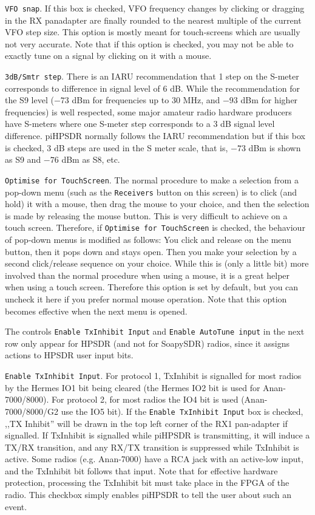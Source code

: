 \documentclass[12pt]{book}
\def\rett#1{\texttt{\color{red}#1}}
\def\pH{pi\-HPSDR\xspace}
\begin{document}
\rett{VFO snap}. If this box is checked, VFO frequency changes by clicking or dragging in the
RX panadapter are finally rounded to the nearest multiple of the current VFO step size. This
option is mostly meant for touch-screens which are usually not very accurate. Note that if
this option is checked, you may not be able to exactly tune on a signal by clicking on
it with a mouse.

\rett{3dB/Smtr step}. There is an IARU recommendation that 1 step on the S-meter
corresponds to difference in signal level of 6 dB. While the recommendation for the
S9 level ($-73$ dBm for frequencies up to 30 MHz, and $-93$ dBm for higher frequencies)
is well respected, some major amateur radio hardware producers have S-meters where
one S-meter step corresponds to a 3 dB signal level difference. \pH normally follows
the IARU recommendation but if this box is checked, 3 dB steps are used in the S meter
scale, that is, $-73$ dBm is shown as S9 and $-76$ dBm as S8, etc.

\rett{Optimise for TouchScreen}. The normal procedure to make a selection from a
pop-down menu (such as the \rett{Receivers} button on this screen) is to click
(and hold) it with a mouse, then drag the mouse to your choice, and then the selection
is made by releasing the mouse button. This is very difficult to achieve on a touch
screen. Therefore, if \rett{Optimise for TouchScreen} is checked, the behaviour of pop-down
menus is modified as follows: You click and release on the menu button, then it pops
down and stays open. Then you make your selection by a second click/release sequence
on your choice. While this is (only a little bit) more involved than the normal procedure
when using a mouse, it is a great helper when using a touch screen. Therefore this
option is set by default, but you can uncheck it here if you prefer normal
mouse operation. Note that this option becomes effective when the next menu is opened.


The controls \rett{Enable TxInhibit Input} and \rett{Enable AutoTune  input}
in the next row only appear for HPSDR (and not for SoapySDR) radios, since it assigns actions to
HPSDR user input bits.

\rett{Enable TxInhibit Input}. For  protocol 1, TxInhibit is signalled for most radios by the Hermes IO1 bit being
cleared (the Hermes IO2 bit is used for Anan-7000/8000). For protocol 2, for most
radios the IO4 bit is used (Anan-7000/8000/G2 use the IO5 bit).
If the \rett{Enable TxInhibit Input} box is checked, ,,TX Inhibit'' will be drawn
in the top left corner of the RX1 pan-adapter if signalled. If TxInhibit is signalled
while \pH is transmitting, it will induce a TX/RX transition, and any RX/TX
transition is suppressed while TxInhibit is active. Some radios (e.g. Anan-7000) have
a RCA jack with an active-low input, and the TxInhibit bit follows that input.
Note that for effective hardware protection, processing the TxInhibit bit must
take place in the FPGA of the radio. This checkbox simply enables \pH to tell
the user about such an event.
\end{document}
